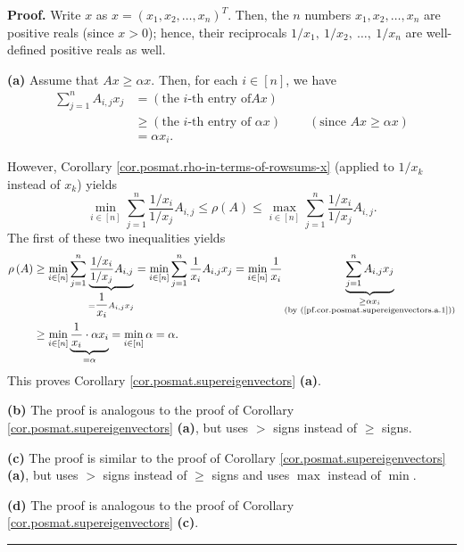 \documentclass[numbers=enddot,12pt,final,onecolumn,notitlepage]{scrartcl}%
\numberwithin{exer}{subsection}
\theoremstyle{definition}
\newenvironment{proof}[1][Proof]{\noindent\textbf{#1.} }{\ \rule{0.5em}{0.5em}}
\let\sumnonlimits\sum
\renewcommand{\sum}{\sumnonlimits\limits}
\begin{document}
\begin{proof}
Write $x$ as $x=\left(  x_{1},x_{2},\ldots,x_{n}\right)  ^{T}$. Then, the $n$
numbers $x_{1},x_{2},\ldots,x_{n}$ are positive reals (since $x>0$); hence,
their reciprocals $1/x_{1},\ 1/x_{2},\ \ldots,\ 1/x_{n}$ are well-defined
positive reals as well. \medskip

\textbf{(a)} Assume that $Ax\geq\alpha x$. Then, for each $i\in\left[
n\right]  $, we have%
\begin{align}
\sum_{j=1}^{n}A_{i,j}x_{j}  &  =\left(  \text{the }i\text{-th entry of
}Ax\right) \nonumber\\
&  \geq\left(  \text{the }i\text{-th entry of }\alpha x\right)
\ \ \ \ \ \ \ \ \ \ \left(  \text{since }Ax\geq\alpha x\right) \nonumber\\
&  =\alpha x_{i}. \label{pf.cor.posmat.supereigenvectors.a.1}%
\end{align}


However, Corollary \ref{cor.posmat.rho-in-terms-of-rowsums-x} (applied to
$1/x_{k}$ instead of $x_{k}$) yields%
\[
\min\limits_{i\in\left[  n\right]  }\sum_{j=1}^{n}\dfrac{1/x_{i}}{1/x_{j}%
}A_{i,j}\leq\rho\left(  A\right)  \leq\max\limits_{i\in\left[  n\right]  }%
\sum_{j=1}^{n}\dfrac{1/x_{i}}{1/x_{j}}A_{i,j}.
\]
The first of these two inequalities yields%
\begin{align*}
\rho\left(  A\right)   &  \geq\min\limits_{i\in\left[  n\right]  }\sum
_{j=1}^{n}\underbrace{\dfrac{1/x_{i}}{1/x_{j}}A_{i,j}}_{=\dfrac{1}{x_{i}%
}A_{i,j}x_{j}}=\min\limits_{i\in\left[  n\right]  }\sum_{j=1}^{n}\dfrac
{1}{x_{i}}A_{i,j}x_{j}=\min\limits_{i\in\left[  n\right]  }\dfrac{1}{x_{i}%
}\underbrace{\sum_{j=1}^{n}A_{i,j}x_{j}}_{\substack{\geq\alpha x_{i}%
\\\text{(by (\ref{pf.cor.posmat.supereigenvectors.a.1}))}}}\\
&  \geq\min\limits_{i\in\left[  n\right]  }\underbrace{\dfrac{1}{x_{i}}%
\cdot\alpha x_{i}}_{=\alpha}=\min\limits_{i\in\left[  n\right]  }\alpha
=\alpha.
\end{align*}
This proves Corollary \ref{cor.posmat.supereigenvectors} \textbf{(a)}.
\medskip

\textbf{(b)} The proof is analogous to the proof of Corollary
\ref{cor.posmat.supereigenvectors} \textbf{(a)}, but uses $>$ signs instead of
$\geq$ signs. \medskip

\textbf{(c)} The proof is similar to the proof of Corollary
\ref{cor.posmat.supereigenvectors} \textbf{(a)}, but uses $>$ signs instead of
$\geq$ signs and uses $\max$ instead of $\min$. \medskip

\textbf{(d)} The proof is analogous to the proof of Corollary
\ref{cor.posmat.supereigenvectors} \textbf{(c)}.
\end{proof}
\end{document}

